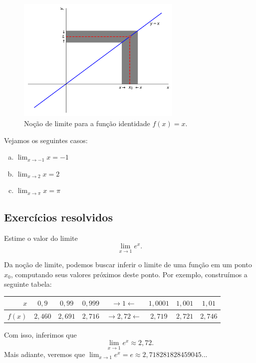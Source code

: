 \begin{figure}[H]
  \centering
  \includegraphics[width=0.7\textwidth]{./cap_lim/dados/fig_lim_funid/fig_lim_funid}
  \caption{Noção de limite para a função identidade $f(x)=x$.}
  \label{fig:lim_funid}
\end{figure}

\begin{ex}
  Vejamos os seguintes casos:
  \begin{enumerate}[a)]
  \item $\displaystyle \lim_{x\to -1} x = -1$
  \item $\displaystyle \lim_{x\to 2} x = 2$
  \item $\displaystyle \lim_{x\to \pi} x = \pi$
  \end{enumerate}
\end{ex}

\subsection*{Exercícios resolvidos}

\begin{exeresol}
  Estime o valor do limite
  \begin{equation}
    \lim_{x\to 1} e^x.
  \end{equation}
\end{exeresol}
\begin{resol}
  Da noção de limite, podemos buscar inferir o limite de uma função em um ponto $x_0$, computando seus valores próximos deste ponto. Por exemplo, construímos a seguinte tabela:
  
  \begin{tabular}{r|ccc|c|ccc}
    $x$ & $0,9$ & $0,99$ & $0,999$ & $\rightarrow 1 \leftarrow$ & $1,0001$ & $1,001$ & $1,01$\\\hline
    $f(x)$ & $2,460$ & $2,691$ & $2,716$ & $\rightarrow 2,72 \leftarrow$ & $2,719$ & $2,721$ & $2,746$
  \end{tabular}
  
  Com isso, inferimos que
  \begin{equation}
    \lim_{x\to 1} e^x \approx 2,72.
  \end{equation}
  Mais adiante, veremos que $\lim_{x\to 1} e^x = e \approx 2,718281828459045 ...$
\end{resol}

